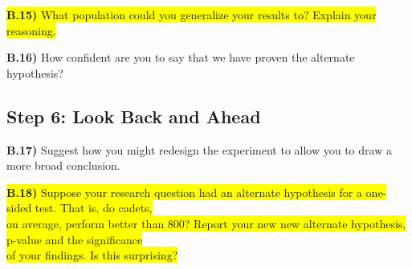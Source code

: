 \documentclass{article}
\newif\ifPrintSolution
\newcommand{\sol}[1]{\ifPrintSolution {\color{blue} #1 } \fi}
\begin{document}
\sol{No,  observational units from different regiments did not have an equal chance of being selected and so we cannot generalize these results to populations outside of 1st REG.}

\vspace{0.25in}

\colorbox{yellow}{\textbf{B.15)} What population could you generalize your results to? Explain your reasoning.}

\sol{We can generalize these results to the 1st Regiment population of cadets, as those cadets had an equal probability of being sampled for this study.}

\vspace{0.25in}

\textbf{B.16)} How confident are you to say that we have proven the alternate hypothesis?

\sol{We never say we proved or disproved a hypothesis, only that we have strong evidence against the null hypothesis.}

\vspace{0.25in}


\subsection*{Step 6: Look Back and Ahead}

\textbf{B.17)} Suggest how you might redesign the experiment to allow you to draw a more broad conclusion.

\sol{To generalize to the corps of cadets, we would randomly sample from the entire population of the corps of cadets instead of just one regiment.}

\vspace{0.25in}

\colorbox{yellow}{\textbf{B.18)} Suppose your research question had an alternate hypothesis for a one-sided test. That is, do cadets,}\\ \colorbox{yellow}{on average, perform better than 800? Report your new new alternate hypothesis, p-value  and the significance}\\ \colorbox{yellow}{of your findings. Is this surprising?}

\sol{$H_a: \mu > 800; \; \; \; 1 - pt(4.89647, 292)) = 8.088539e^{-7}$\\
This is not surprising, it should be half the two-sided test, and $\frac{1}{2}$ of .0000016 is 0.0000008}

\vspace{0.75in}
\end{document}
